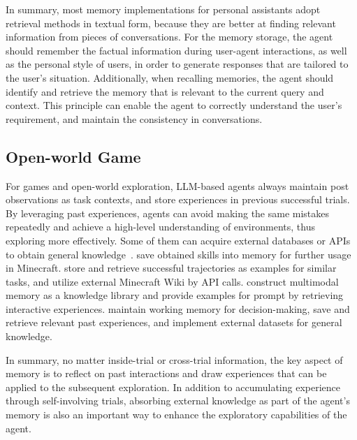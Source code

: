 \documentclass{article}
\theoremstyle{definition}
\theoremstyle{theorem}
\theoremstyle{proof}
\theoremstyle{remark}
\begin{document}
	In summary, most memory implementations for personal assistants adopt retrieval methods in textual form, because they are better at finding relevant information from pieces of conversations.
	For the memory storage, the agent should remember the factual information during user-agent interactions, as well as the personal style of users, in order to generate responses that are tailored to the user's situation.
	Additionally, when recalling memories, the agent should identify and retrieve the memory that is relevant to the current query and context. This principle can enable the agent to correctly understand the user's requirement, and maintain the consistency in conversations.
	
	
	
	\subsection{Open-world Game}
	For games and open-world exploration, LLM-based agents always maintain post observations as task contexts, and store experiences in previous successful trials.
	By leveraging past experiences, agents can avoid making the same mistakes repeatedly and achieve a high-level understanding of environments, thus exploring more effectively.
	Some of them can acquire external databases or APIs to obtain general knowledge~\cite{voyager,gitm,jarvis1,larp}.
	\citet{voyager} save obtained skills into memory for further usage in Minecraft. \citet{gitm} store and retrieve successful trajectories as examples for similar tasks, and utilize external Minecraft Wiki by API calls. \citet{jarvis1} construct multimodal memory as a knowledge library and provide examples for prompt by retrieving interactive experiences. \citet{larp} maintain working memory for decision-making, save and retrieve relevant past experiences, and implement external datasets for general knowledge.
	
	In summary, no matter inside-trial or cross-trial information, the key aspect of memory is to reflect on past interactions and draw experiences that can be applied to the subsequent exploration. In addition to accumulating experience through self-involving trials, absorbing external knowledge as part of the agent's memory is also an important way to enhance the exploratory capabilities of the agent.
	
	
\end{document}
